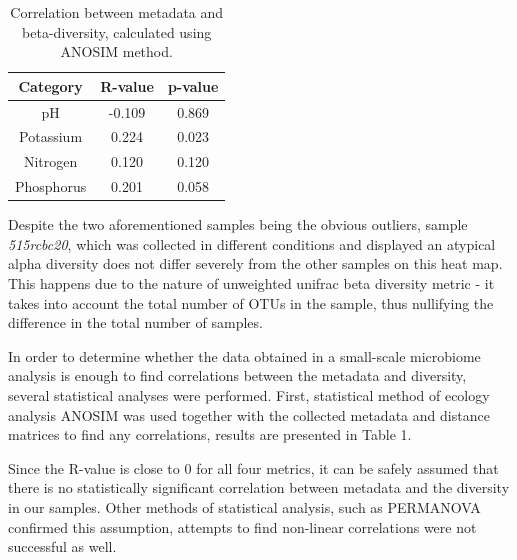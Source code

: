 \documentclass[12pt,twocolumn]{article} %
\begin{document}
\begin{table}[ht!] %
	\begin{center}
		\label{tab:table_correlation}
		\begin{tabular}{c|c|c}
			\textbf{Category} & \textbf{R-value} & \textbf{p-value}\\
			\hline
			pH & -0.109 & 0.869\\
			Potassium & 0.224 & 0.023\\
			Nitrogen & 0.120 & 0.120 \\
			Phosphorus & 0.201 & 0.058\\
		\end{tabular}
		\caption{Correlation between metadata and beta-diversity, calculated using ANOSIM\cite{CLARKE1993} method.}
	\end{center}
\end{table}
\par
Despite the two aforementioned samples being the obvious outliers, sample \textit{515rcbc20}, which was collected in different conditions and displayed an atypical alpha diversity does not differ severely from the other samples on this heat map. This happens due to the nature of unweighted unifrac beta diversity metric - it takes into account the total number of OTUs in the sample, thus nullifying the difference in the total number of samples.
\par
In order to determine whether the data obtained in a small-scale microbiome analysis is enough to find correlations between the metadata and diversity, several statistical analyses were performed. First, statistical method of ecology analysis ANOSIM\cite{CLARKE1993} was used together with the collected metadata and distance matrices to find any correlations, results are presented in Table 1.
\par
Since the R-value is close to 0 for all four metrics, it can be safely assumed that there is no statistically significant correlation between metadata and the diversity in our samples. Other methods of statistical analysis, such as PERMANOVA\cite{Tang2016} confirmed this assumption, attempts to find non-linear correlations were not successful as well.
\end{document}
